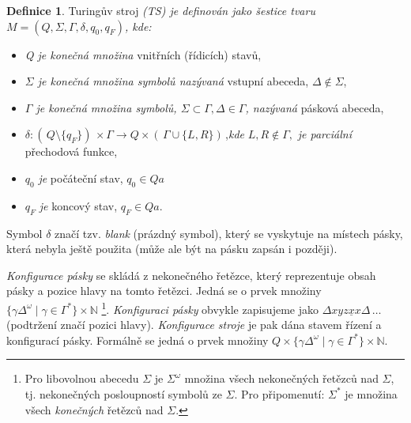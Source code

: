 \documentclass[a4paper, 11pt, twocolumn]{article}
\theoremstyle{definition}
\newtheorem{definition}{Definice}
\begin{document}
\begin{definition}
\label{definice_1}
Turingův stroj \emph{(TS) je definován jako šestice tvaru $M=(Q,\Sigma,\Gamma,\delta, q_0, q_F)$, kde:}

\begin{itemize}
\item \emph{Q je konečná množina} vnitřních (řídicích) stavů,
\item \emph{$\Sigma$ je konečná množina symbolů nazývaná} vstupní abeceda, $\Delta \not\in \Sigma$,
\item \emph{ $\Gamma$ je konečná množina symbolů, $\Sigma \subset \Gamma, \Delta\in \Gamma$, nazývaná} pásková abeceda,
\item $\delta\!:\!( \,Q\setminus\{q_F\})\,\!\times\Gamma \longrightarrow Q\times( \,\Gamma\cup\{L,R\}) \,$,\emph{kde} $ L,R \not\in\Gamma,$ \emph{je parciální} přechodová funkce,
\item $q_0$ \emph{je} počáteční stav, $q_0\in Qa$
\item $q_F$ \emph{je} koncový stav, $q_F\in Qa$.
\end{itemize}

Symbol $\delta$ značí tzv. \emph{blank} (prázdný symbol), který se vyskytuje na místech pásky, která nebyla ještě použita (může ale být na pásku zapsán i později).

\emph{Konfigurace pásky} se skládá z nekonečného řetězce,
který reprezentuje obsah pásky a pozice hlavy na tomto řetězci. Jedná se o prvek množiny $\{\gamma \Delta^\omega\mid\gamma\in\Gamma^*\}\times \mathbb{N}$
\footnote{Pro libovolnou abecedu $\Sigma$ je $\Sigma^\omega$ množina všech nekonečných řetězců nad $\Sigma$, tj. nekonečných posloupností symbolů ze $\Sigma$. Pro připomenutí: $\Sigma^*$ je množina všech \emph{konečných} řetězců nad $\Sigma$.}.
\emph{Konfiguraci pásky} obvykle zapisujeme jako $\Delta xyz\underline{x}x\Delta\,\dots$ (podtržení značí pozici hlavy). \emph{Konfigurace stroje} je pak dána stavem řízení a konfigurací pásky. Formálně se jedná o prvek množiny $Q\times\{\gamma\Delta^\omega\mid\gamma\in\Gamma^*\}\times\mathbb{N}$.


\end{definition}
\end{document}
